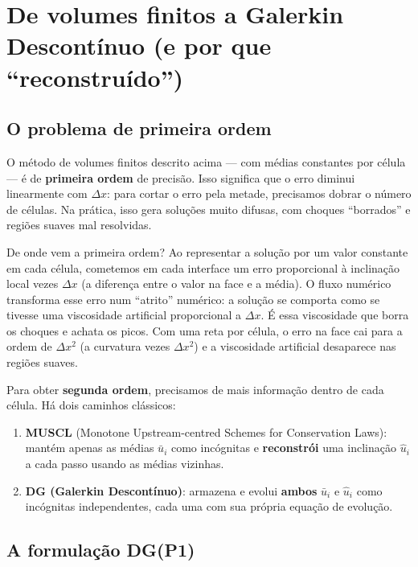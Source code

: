 \documentclass[10pt,a4paper]{article}
\newcommand{\ub}{\bar u}
\newcommand{\uh}{\hat u}
\begin{document}
\section{De volumes finitos a Galerkin Descontínuo (e por que ``reconstruído'')}

\subsection{O problema de primeira ordem}

O método de volumes finitos descrito acima --- com médias constantes por célula --- é de \textbf{primeira ordem} de precisão. Isso significa que o erro diminui linearmente com $\Delta x$: para cortar o erro pela metade, precisamos dobrar o número de células. Na prática, isso gera soluções muito difusas, com choques ``borrados'' e regiões suaves mal resolvidas.

\begin{intuicao}
De onde vem a primeira ordem? Ao representar a solução por um valor constante em cada célula, cometemos em cada interface um erro proporcional à inclinação local vezes $\Delta x$ (a diferença entre o valor na face e a média). O fluxo numérico transforma esse erro num ``atrito'' numérico: a solução se comporta como se tivesse uma viscosidade artificial proporcional a $\Delta x$. É essa viscosidade que borra os choques e achata os picos. Com uma reta por célula, o erro na face cai para a ordem de $\Delta x^2$ (a curvatura vezes $\Delta x^2$) e a viscosidade artificial desaparece nas regiões suaves.
\end{intuicao}

Para obter \textbf{segunda ordem}, precisamos de mais informação dentro de cada célula. Há dois caminhos clássicos:
\begin{enumerate}[leftmargin=2.5em,itemsep=3pt]
\item \textbf{MUSCL} (Monotone Upstream-centred Schemes for Conservation Laws): mantém apenas as médias $\ub_i$ como incógnitas e \textbf{reconstrói} uma inclinação $\uh_i$ a cada passo usando as médias vizinhas.
\item \textbf{DG (Galerkin Descontínuo)}: armazena e evolui \textbf{ambos} $\ub_i$ e $\uh_i$ como incógnitas independentes, cada uma com sua própria equação de evolução.
\end{enumerate}

\subsection{A formulação DG(P1)}
\end{document}
